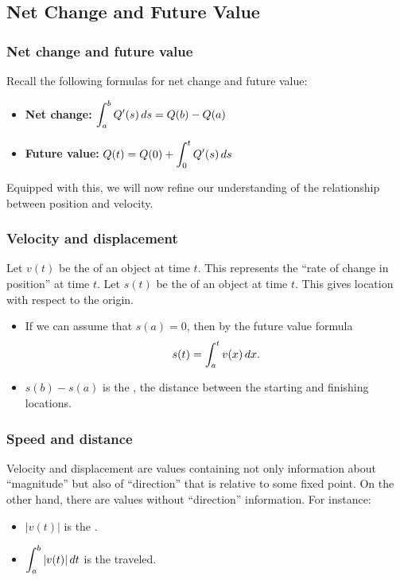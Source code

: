 \documentclass[10pt,t,handout,ignorenonframetext,aspectratio=169]{beamer}
\title[\course]{\lecTitle}
\institute[Ohio State]
{
  \medskip
}
\date[\week]{\semester}
\author{Tae Eun Kim, Ph.D.}
\begin{document}
\begin{frame}
  \titlepage
\end{frame}



\subsection{Net Change and Future Value}
\begin{frame}
  \frametitle{Net change and future value}
  Recall the following formulas for net change and future value:
  \begin{itemize}
  \item \textbf{Net change:} $\displaystyle \int_a^b Q'(s) \mathop{}\!d s = Q(b) - Q(a)$
  \item \textbf{Future value:} $\displaystyle Q(t) = Q(0) + \int_0^t Q'(s) \mathop{}\!d s$
  \end{itemize}

  Equipped with this, we will now refine our understanding of the
  relationship between position and velocity.
\end{frame}

\begin{frame}
  \frametitle{Velocity and displacement}
  Let $v(t)$ be the  of an object at time $t$. This
  represents the ``rate of change in position'' at time $t$. Let $s(t)$ be
  the  of an object at time $t$. This gives location
  with respect to the origin.
  \begin{itemize}
  \item If we can assume that
    $s(a) = 0$, then by the future value formula
    \[
      s(t) = \int_a^t v(x) \mathop{}\!d x.
    \]
  \item $s(b) -s(a)$ is the , the distance between
    the starting and finishing locations.
  \end{itemize}
\end{frame}

\begin{frame}
  \frametitle{Speed and distance}
  Velocity and displacement are values containing not only information
  about {``magnitude''} but also of {``direction''} that is relative
  to some fixed point. On the other hand, there are values without
  {``direction''} information. For instance:
  \begin{itemize}
  \item $|v(t)|$ is the .
  \item $\displaystyle \int_a^b |v(t)| \mathop{}\!d t$ is the  traveled.
  \end{itemize}
\end{frame}
\end{document}
